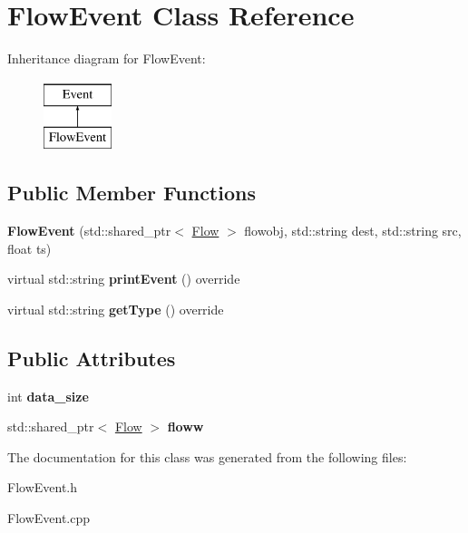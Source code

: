 \hypertarget{classFlowEvent}{\section{\-Flow\-Event \-Class \-Reference}
\label{classFlowEvent}
}
\-Inheritance diagram for \-Flow\-Event\-:\begin{figure}[H]
\begin{center}
\leavevmode
\includegraphics[height=2.000000cm]{classFlowEvent}
\end{center}
\end{figure}
\subsection*{\-Public \-Member \-Functions}
\begin{DoxyCompactItemize}
\item 
\hypertarget{classFlowEvent_a847531a58e1e8ff6adf4a51fad9cc2c0}{{\bfseries \-Flow\-Event} (std\-::shared\-\_\-ptr$<$ \hyperlink{classFlow}{\-Flow} $>$ flowobj, std\-::string dest, std\-::string src, float ts)}\label{classFlowEvent_a847531a58e1e8ff6adf4a51fad9cc2c0}

\item 
\hypertarget{classFlowEvent_a96fc31ece4164d62db961a1ae6862e70}{virtual std\-::string {\bfseries print\-Event} () override}\label{classFlowEvent_a96fc31ece4164d62db961a1ae6862e70}

\item 
\hypertarget{classFlowEvent_a6712fde91ba4bbe86918315e85dff998}{virtual std\-::string {\bfseries get\-Type} () override}\label{classFlowEvent_a6712fde91ba4bbe86918315e85dff998}

\end{DoxyCompactItemize}
\subsection*{\-Public \-Attributes}
\begin{DoxyCompactItemize}
\item 
\hypertarget{classFlowEvent_ae6010e994bd60eff8cb63478f1df0f40}{int {\bfseries data\-\_\-size}}\label{classFlowEvent_ae6010e994bd60eff8cb63478f1df0f40}

\item 
\hypertarget{classFlowEvent_ad0ecfc4035bbfcfaa16f87fcea1b90f2}{std\-::shared\-\_\-ptr$<$ \hyperlink{classFlow}{\-Flow} $>$ {\bfseries floww}}\label{classFlowEvent_ad0ecfc4035bbfcfaa16f87fcea1b90f2}

\end{DoxyCompactItemize}


\-The documentation for this class was generated from the following files\-:\begin{DoxyCompactItemize}
\item 
\-Flow\-Event.\-h\item 
\-Flow\-Event.\-cpp\end{DoxyCompactItemize}
